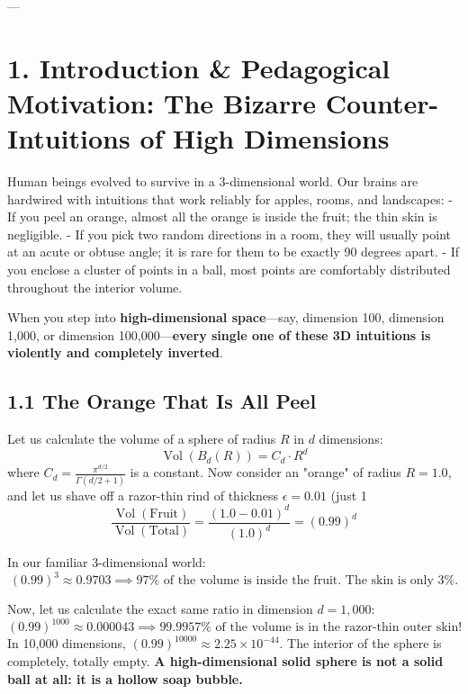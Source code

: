 \documentclass[11pt,twoside,openright]{amsbook}
\begin{document}
---

\section{1. Introduction & Pedagogical Motivation: The Bizarre Counter-Intuitions of High Dimensions}

Human beings evolved to survive in a 3-dimensional world. Our brains are hardwired with intuitions that work reliably for apples, rooms, and landscapes:
- If you peel an orange, almost all the orange is inside the fruit; the thin skin is negligible.
- If you pick two random directions in a room, they will usually point at an acute or obtuse angle; it is rare for them to be exactly 90 degrees apart.
- If you enclose a cluster of points in a ball, most points are comfortably distributed throughout the interior volume.

When you step into \textbf{high-dimensional space}—say, dimension 100, dimension 1,000, or dimension 100,000—\textbf{every single one of these 3D intuitions is violently and completely inverted}.

\subsection{1.1 The Orange That Is All Peel}
Let us calculate the volume of a sphere of radius $R$ in $d$ dimensions:
$$\operatorname{Vol}(B_d(R)) = C_d \cdot R^d$$
where $C_d = \frac{\pi^{d/2}}{\Gamma(d/2 + 1)}$ is a constant.
Now consider an "orange" of radius $R = 1.0$, and let us shave off a razor-thin rind of thickness $\epsilon = 0.01$ (just 1%
$$\frac{\operatorname{Vol}(\text{Fruit})}{\operatorname{Vol}(\text{Total})} = \frac{(1.0 - 0.01)^d}{(1.0)^d} = (0.99)^d$$

In our familiar 3-dimensional world:
$$(0.99)^3 \approx 0.9703 \implies 97\% \text{ of the volume is inside the fruit. The skin is only } 3\%.$$

Now, let us calculate the exact same ratio in dimension $d = 1,000$:
$$(0.99)^{1000} \approx 0.000043 \implies 99.9957\% \text{ of the volume is in the razor-thin outer skin!}$$
In 10,000 dimensions, $(0.99)^{10000} \approx 2.25 \times 10^{-44}$. The interior of the sphere is completely, totally empty. \textbf{A high-dimensional solid sphere is not a solid ball at all: it is a hollow soap bubble.}
\end{document}
